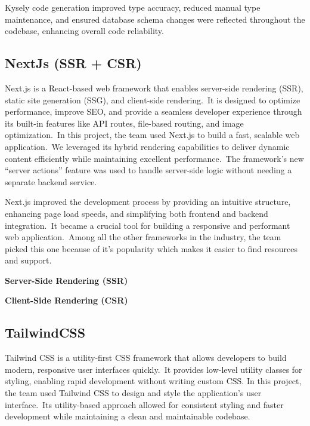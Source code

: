 Kysely code generation improved type accuracy, reduced manual type maintenance, and ensured database schema changes were reflected throughout the codebase, enhancing overall code reliability.



\subsection{NextJs (SSR + CSR)}\label{subsec:nextjs-(ssr-+-csr)}

Next.js is a React-based web framework that enables server-side rendering (SSR), static site generation (SSG), and client-side rendering.\ It is designed to optimize performance, improve SEO, and provide a seamless developer experience through its built-in features like API routes, file-based routing, and image optimization.\ In this project, the team used Next.js to build a fast, scalable web application.\ We leveraged its hybrid rendering capabilities to deliver dynamic content efficiently while maintaining excellent performance.\ The framework’s new ``server actions'' feature was used to handle server-side logic without needing a separate backend service.\cite[Next.js]{nextjs}

Next.js improved the development process by providing an intuitive structure, enhancing page load speeds, and simplifying both frontend and backend integration.\ It became a crucial tool for building a responsive and performant web application.\ Among all the other frameworks in the industry, the team picked this one because of it's popularity which makes it easier to find resources and support.

\textbf{Server-Side Rendering (SSR)}\label{subsubsec:server-side-rendering-(ssr)}


\textbf{Client-Side Rendering (CSR)}\label{subsubsec:client-side-rendering-(csr)}


\subsection{TailwindCSS}\label{subsec:tailwindcss}

Tailwind CSS is a utility-first CSS framework that allows developers to build modern, responsive user interfaces quickly.\ It provides low-level utility classes for styling, enabling rapid development without writing custom CSS. In this project, the team used Tailwind CSS to design and style the application's user interface.\ Its utility-based approach allowed for consistent styling and faster development while maintaining a clean and maintainable codebase.\cite[TailwindCSS]{tailwind}

